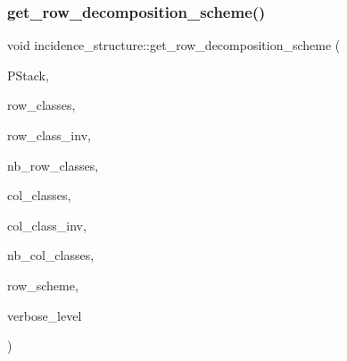 \mbox{\label{classincidence__structure_aa0ad04253ba8e75bb15900ee8b01c9aa}} 
\subsubsection{\texorpdfstring{get\+\_\+row\+\_\+decomposition\+\_\+scheme()}{get\_row\_decomposition\_scheme()}}
{\footnotesize\ttfamily void incidence\+\_\+structure\+::get\+\_\+row\+\_\+decomposition\+\_\+scheme (\begin{DoxyParamCaption}\item[{\mbox{\hyperlink{classpartitionstack}{partitionstack}} \&}]{P\+Stack,  }\item[{\mbox{\hyperlink{galois_8h_a09fddde158a3a20bd2dcadb609de11dc}{I\+NT}} $\ast$}]{row\+\_\+classes,  }\item[{\mbox{\hyperlink{galois_8h_a09fddde158a3a20bd2dcadb609de11dc}{I\+NT}} $\ast$}]{row\+\_\+class\+\_\+inv,  }\item[{\mbox{\hyperlink{galois_8h_a09fddde158a3a20bd2dcadb609de11dc}{I\+NT}}}]{nb\+\_\+row\+\_\+classes,  }\item[{\mbox{\hyperlink{galois_8h_a09fddde158a3a20bd2dcadb609de11dc}{I\+NT}} $\ast$}]{col\+\_\+classes,  }\item[{\mbox{\hyperlink{galois_8h_a09fddde158a3a20bd2dcadb609de11dc}{I\+NT}} $\ast$}]{col\+\_\+class\+\_\+inv,  }\item[{\mbox{\hyperlink{galois_8h_a09fddde158a3a20bd2dcadb609de11dc}{I\+NT}}}]{nb\+\_\+col\+\_\+classes,  }\item[{\mbox{\hyperlink{galois_8h_a09fddde158a3a20bd2dcadb609de11dc}{I\+NT}} $\ast$}]{row\+\_\+scheme,  }\item[{\mbox{\hyperlink{galois_8h_a09fddde158a3a20bd2dcadb609de11dc}{I\+NT}}}]{verbose\+\_\+level }\end{DoxyParamCaption})}

\mbox{\label{classincidence__structure_ac93d2a6419b0fca3f25f101c5f08caf5}} 
